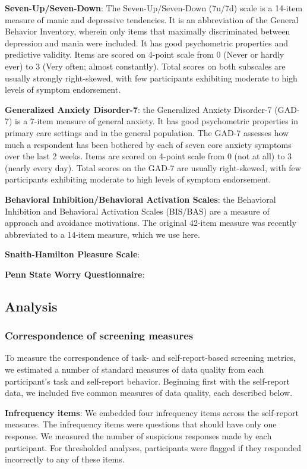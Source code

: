 \documentclass[a4paper,notitlepage,12pt]{article}
\begin{document}
\textbf{Seven-Up/Seven-Down}: The Seven-Up/Seven-Down (7u/7d) scale is a 14-item measure of manic and depressive tendencies. It is an abbreviation of the General Behavior Inventory, wherein only items that maximally discriminated between depression and mania were included. It has good psychometric properties and predictive validity. Items are scored on 4-point scale from 0 (Never or hardly ever) to 3 (Very often; almost constantly). Total scores on both subscales are usually strongly right-skewed, with few participants exhibiting moderate to high levels of symptom endorsement. 

\textbf{Generalized Anxiety Disorder-7}: the Generalized Anxiety Disorder-7 (GAD-7) is a 7-item measure of general anxiety. It has good psychometric properties in primary care settings and in the general population. The GAD-7 assesses how much a respondent has been bothered by each of seven core anxiety symptoms over the last 2 weeks. Items are scored on 4-point scale from 0 (not at all) to 3 (nearly every day). Total scores on the GAD-7 are usually right-skewed, with few participants exhibiting moderate to high levels of symptom endorsement.

\textbf{Behavioral Inhibition/Behavioral Activation Scales}: the Behavioral Inhibition and Behavioral Activation Scales (BIS/BAS) are a measure of approach and avoidance motivations. The original 42-item measure was recently abbreviated to a 14-item measure, which we use here.

\textbf{Snaith-Hamilton Pleasure Scale}:

\textbf{Penn State Worry Questionnaire}:

\subsection{Analysis}

\subsubsection{Correspondence of screening measures}

To measure the correspondence of task- and self-report-based screening metrics, we estimated a number of standard measures of data quality from each participant's task and self-report behavior. Beginning first with the self-report data, we included five common measures of data quality, each described below.

\textbf{Infrequency items}: We embedded four infrequency items across the self-report measures. The infrequency items were questions that should have only one response. We measured the number of suspicious responses made by each participant. For thresholded analyses, participants were flagged if they responded incorrectly to any of these items.
\end{document}
